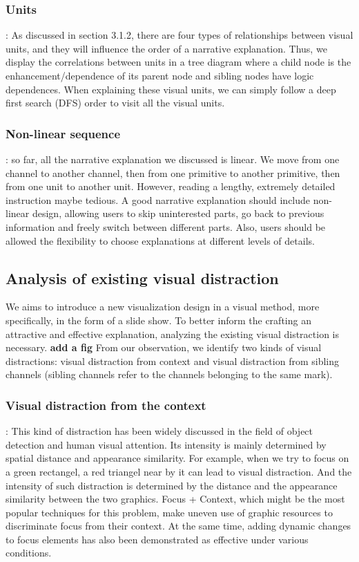\subsubsection{Units}: As discussed in section 3.1.2, there are four types of relationships between visual units, and they will influence the order of a narrative explanation. Thus, we display the correlations between units in a tree diagram where a child node is the enhancement/dependence of its parent node and sibling nodes have logic dependences. When explaining these visual units, we can simply follow a deep first search (DFS) order to visit all the visual units.\par
\subsubsection{Non-linear sequence}: so far, all the narrative explanation we discussed is linear. We move from one channel to another channel, then from one primitive to another primitive, then from one unit to another unit. However, reading a lengthy, extremely detailed instruction maybe tedious. A good narrative explanation should include non-linear design, allowing users to skip uninterested parts, go back to previous information and freely switch between different parts. Also, users should be allowed the flexibility to choose explanations at different levels of details. 

\subsection{Analysis of existing visual distraction}
We aims to introduce a new visualization design in a visual method, more specifically, in the form of a slide show. To better inform the crafting an attractive and effective explanation, analyzing the existing visual distraction is necessary. 
\textbf{add a fig}
From our observation, we identify two kinds of visual distractions: visual distraction from context and visual distraction from sibling channels (sibling channels refer to the channels belonging to the same mark). \par
\subsubsection{Visual distraction from the context}: This kind of distraction has been widely discussed in the field of object detection and human visual attention. \cite{nothdurft_salience_2000, standage_modelling_2005}Its intensity is mainly  determined by spatial distance and appearance similarity. \cite{wolfe_guided_1994}For example, when we try to focus on a green rectangel, a red triangel near by it can lead to visual distraction. And the intensity of such distraction is determined by the distance and the appearance similarity between the two graphics. Focus + Context, which might be the most popular techniques for this problem, make uneven use of graphic resources to discriminate focus from their context. At the same time, adding dynamic changes to focus elements has also been demonstrated as effective under various conditions\cite{waldner_attractive_2014}. 

